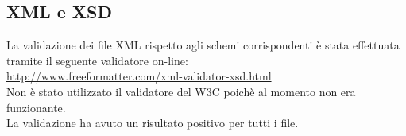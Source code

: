 \subsection{XML e XSD}
La validazione dei file XML rispetto agli schemi corrispondenti \`e stata effettuata tramite il seguente validatore on-line:
\\
\href{http://www.freeformatter.com/xml-validator-xsd.html}{http://www.freeformatter.com/xml-validator-xsd.html}
\\Non è stato utilizzato il validatore del W3C poich\`e al momento non era funzionante.
\\La validazione ha avuto un risultato positivo per tutti i file.
